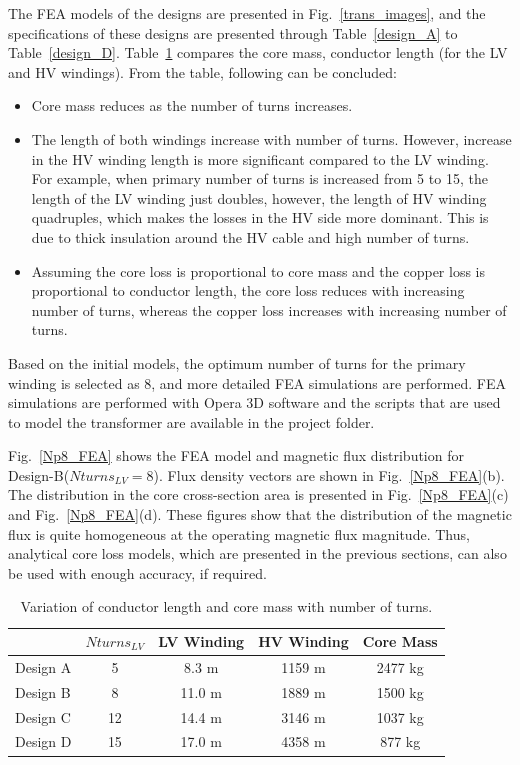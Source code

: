 \documentclass[a4paper, 11pt]{article} %
\begin{document}
The FEA models of the designs are presented in Fig.~\ref{trans_images}, and the specifications of these designs are presented through Table~\ref{design_A} to Table~\ref{design_D}. Table~\ref{conductor_length} compares the core mass, conductor length (for the LV and HV windings). 
From the table, following can be concluded:
\begin{itemize}
\item Core mass reduces as the number of turns increases.
\item The length of both windings increase with number of turns. However, increase in the HV winding length is more significant compared to the LV winding. For example, when primary number of turns is increased from  5 to 15, the length of the LV winding just doubles, however, the length of HV winding quadruples, which makes the losses in the HV side more dominant. This is due to thick insulation around the HV cable and high number of turns.
\item Assuming the core loss is proportional to core mass and the copper loss is proportional to conductor length, the core loss reduces with increasing number of turns, whereas the copper loss increases with increasing number of turns.
\end{itemize}


Based on the initial models, the optimum number of turns for the primary winding is selected as 8, and more detailed FEA simulations are performed. FEA simulations are performed with Opera 3D software and the scripts that are used to model the transformer are available in the project folder.

Fig.~\ref{Np8_FEA} shows the FEA model and magnetic flux distribution for Design-B($Nturns_{LV}=8$). Flux density vectors are shown in Fig.~\ref{Np8_FEA}(b). The distribution in the core cross-section area is presented in Fig.~\ref{Np8_FEA}(c) and Fig.~\ref{Np8_FEA}(d). These figures show that the distribution of the magnetic flux is quite homogeneous at the operating magnetic flux magnitude. Thus, analytical core loss models, which are presented in the previous sections, can also be used with enough accuracy, if required.


\begin{table}[]
\begin{center}
\begin{tabular}{lcccc}
& $Nturns_{LV}$ & LV Winding & HV Winding & Core Mass \\
\hline
Design A & 5 & 8.3 m & 1159 m & 2477 kg \\
Design B & 8 & 11.0 m & 1889 m & 1500 kg \\
Design C & 12 & 14.4 m & 3146 m & 1037 kg \\
Design D & 15 & 17.0 m & 4358 m & 877 kg \\
\hline
\end{tabular} 
\end{center}
\caption{Variation of conductor length and core mass with number of turns.}
\label{conductor_length}
\end{table}
\end{document}
